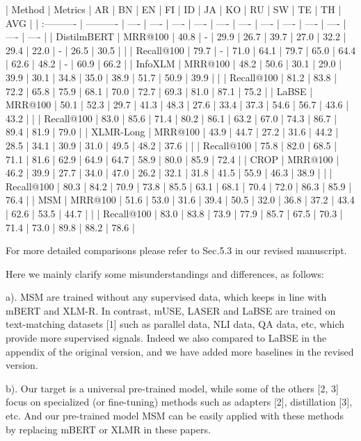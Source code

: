 | Method      | Metrics    | AR   | BN   | EN   | FI   | ID   | JA   | KO   | RU   | SW   | TE   | TH   | AVG  |
| :---------- | ---------- | ---- | ---- | ---- | ---- | ---- | ---- | ---- | ---- | ---- | ---- | ---- | ---- |
| DistilmBERT | MRR@100    | 40.8 | -    | 29.9 | 26.7 | 39.7 | 27.0 | 32.2 | 29.4 | 22.0 | -    | 26.5 | 30.5 |
|             | Recall@100 | 79.7 | -    | 71.0 | 64.1 | 79.7 | 65.0 | 64.4 | 62.6 | 48.2 | -    | 60.9 | 66.2 |
| InfoXLM     | MRR@100    | 48.2 | 50.6 | 30.1 | 29.0 | 39.9 | 30.1 | 34.8 | 35.0 | 38.9 | 51.7 | 50.9 | 39.9 |
|             | Recall@100 | 81.2 | 83.8 | 72.2 | 65.8 | 75.9 | 68.1 | 70.0 | 72.7 | 69.3 | 81.0 | 87.1 | 75.2 |
| LaBSE       | MRR@100    | 50.1 | 52.3 | 29.7 | 41.3 | 48.3 | 27.6 | 33.4 | 37.3 | 54.6 | 56.7 | 43.6 | 43.2 |
|             | Recall@100 | 83.0 | 85.6 | 71.4 | 80.2 | 86.1 | 63.2 | 67.0 | 74.3 | 86.7 | 89.4 | 81.9 | 79.0 |
| XLMR-Long   | MRR@100    | 43.9 | 44.7 | 27.2 | 31.6 | 44.2 | 28.5 | 34.1 | 30.9 | 31.0 | 49.5 | 48.2 | 37.6 |
|             | Recall@100 | 75.8 | 82.0 | 68.5 | 71.1 | 81.6 | 62.9 | 64.9 | 64.7 | 58.9 | 80.0 | 85.9 | 72.4 |
| CROP        | MRR@100    | 46.2 | 39.9 | 27.7 | 34.0 | 47.0 | 26.2 | 32.1 | 31.8 | 41.5 | 55.9 | 46.3 | 38.9 |
|             | Recall@100 | 80.3 | 84.2 | 70.9 | 73.8 | 85.5 | 63.1 | 68.1 | 70.4 | 72.0 | 86.3 | 85.9 | 76.4 |
| MSM         | MRR@100    | 51.6 | 53.0 | 31.6 | 39.4 | 50.5 | 32.0 | 36.8 | 37.2 | 43.4 | 62.6 | 53.5 | 44.7 |
|             | Recall@100 | 83.0 | 83.8 | 73.9 | 77.9 | 85.7 | 67.5 | 70.3 | 71.4 | 73.0 | 89.8 | 88.2 | 78.6 |

For more detailed comparisons please refer to Sec.5.3 in our revised manuscript. 

Here we mainly clarify some misunderstandings and differences, as follows: 

a). MSM are trained without any supervised data, which keeps in line with mBERT and XLM-R. In contrast, mUSE, LASER and LaBSE are trained on text-matching datasets [1] such as parallel data, NLI data, QA data, etc, which provide more supervised signals. Indeed we also compared to LaBSE in the appendix of the original version, and we have added more baselines in the revised version. 

b). Our target is a universal pre-trained model, while some of the others [2, 3] focus on specialized (or fine-tuning) methods such as adapters [2], distillation [3], etc. And our pre-trained model MSM can be easily applied with these methods by replacing mBERT or XLMR in these papers.

